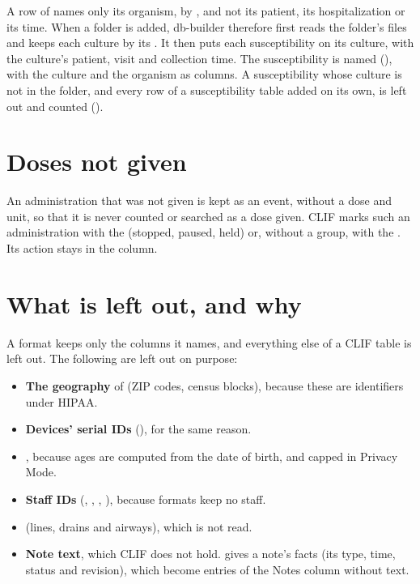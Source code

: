 A row of  names only its organism, by , and
not its patient, its hospitalization or its time. When a folder is added, db-builder therefore
first reads the folder's  files and keeps each culture by its
. It then puts each susceptibility on its culture, with the culture's patient,
visit and collection time. The susceptibility is named 
(), with the culture and the organism as columns. A
susceptibility whose culture is not in the folder, and every row of a susceptibility table
added on its own, is left out and counted ().

\section{Doses not given}
\label{sec:clif-not-given}

An administration that was not given is kept as an event, without a dose and unit, so that it is
never counted or searched as a dose given. CLIF marks such an administration with the
  (stopped, paused, held) or, without a group,
with the  . Its action stays in the  column.

\section{What is left out, and why}
\label{sec:clif-left-out}

A format keeps only the columns it names, and everything else of a CLIF table is left out. The
following are left out on purpose:
\begin{itemize}
\item \textbf{The geography} of  (ZIP codes, census blocks), because these
  are identifiers under HIPAA.
\item \textbf{Devices' serial IDs} (), for the same reason.
\item \textbf{}, because ages are computed from the date of birth, and
  capped in Privacy Mode.
\item \textbf{Staff IDs} (, , ,
  ), because formats keep no staff.
\item \textbf{} (lines, drains and airways), which is not read.
\item \textbf{Note text}, which CLIF does not hold.  gives a note's
  facts (its type, time, status and revision), which become entries of the Notes column without
  text.
\end{itemize}

